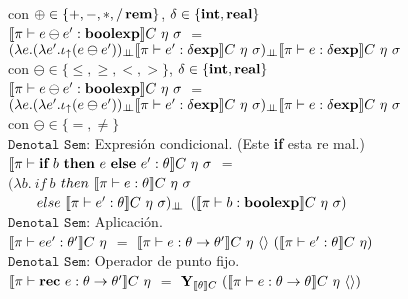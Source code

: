 con $\oplus \in \{ +,-,*,/\,\textbf{rem} \}$, $\delta \in \{\textbf{int},\textbf{real}\}$\\

$\llbracket  \pi \vdash e \ominus e' : \textbf{boolexp}  \rrbracket C \ \eta \ \sigma$ 
$=$ \\
\indent \indent \indent 
$(\lambda e . (\lambda e' . \iota_{\uparrow} (e \ominus e'))_{\bot \!\!\! \bot}
\llbracket \pi \vdash e' : \delta \textbf{exp} \rrbracket C \ \eta \ \sigma)_{\bot \!\!\! \bot}
\llbracket \pi \vdash e : \delta \textbf{exp} \rrbracket C \ \eta \ \sigma$\\

con $\ominus \in \{\leq,\geq,<,> \}$, $\delta \in \{\textbf{int},\textbf{real}\}$\\

$\llbracket  \pi \vdash e \ominus e' : \textbf{boolexp}  \rrbracket C \ \eta \ \sigma$ 
$=$ \\
\indent \indent \indent 
$(\lambda e . (\lambda e' . \iota_{\uparrow} (e \ominus e'))_{\bot \!\!\! \bot}
\llbracket \pi \vdash e' : \delta \textbf{exp} \rrbracket C \ \eta \ \sigma)_{\bot \!\!\! \bot}
\llbracket \pi \vdash e : \delta \textbf{exp} \rrbracket C \ \eta \ \sigma$\\

con $\ominus \in \{=,\neq\}$\\

\noindent
$\texttt{Denotal Sem:}$ Expresi\'on condicional. (Este \textbf{if} esta re mal.)\\

$\llbracket  \pi \vdash \textbf{if} \ b \ \textbf{then} \ e \ \textbf{else} \ e': \theta  \rrbracket C \ \eta \ \sigma$ 
$=$ \\
\indent \indent \indent 
$(\lambda b . \ if \ b $ $then \ \semBrcks{ \pi \vdash e : \theta}C \ \eta \ \sigma$\\
\indent \indent \indent \indent \indent \ \ \ \
$else \ \llbracket  \pi \vdash e' : \theta \rrbracket C \ \eta \ \sigma)_{\bot \!\!\! \bot}$ 
$(\semBrcks{ \pi \vdash b : \boolexp}C \ \eta \ \sigma)$\\

\noindent
$\texttt{Denotal Sem:}$ Aplicaci\'on.\\

$\semBrcks{ \pi \vdash ee' : \theta' }C \ \eta$ 
$=$ 
$\llbracket  \pi \vdash e : \theta \rightarrow \theta'  \rrbracket C \ \eta \ \langle  \rangle \
(\llbracket  \pi \vdash e' : \theta  \rrbracket C \ \eta)$\\

\noindent
$\texttt{Denotal Sem:}$ Operador de punto fijo.\\

$\llbracket  \pi \vdash \textbf{rec} \ e : \theta \rightarrow \theta'  \rrbracket C \ \eta$ 
$=$ 
$\Y_{\semBrcks{\theta}C} \ 
(\semBrcks{ \pi \vdash e : \theta \rightarrow \theta}C \ \eta \ \lrangles{})$\\

